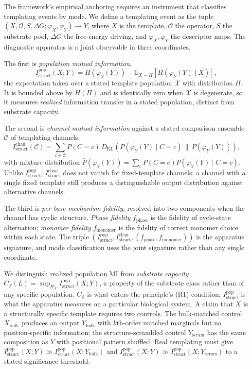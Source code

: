\documentclass[aps,prx,reprint,amsmath,amssymb,floatfix,superscriptaddress,nofootinbib]{revtex4-2}
\theoremstyle{plain-thm}
\theoremstyle{definition-thm}
\newcommand{\Istructpop}{I_{\mathrm{struct}}^{\mathrm{pop}}}
\newcommand{\Istructchan}{I_{\mathrm{struct}}^{\mathrm{chan}}}
\newcommand{\fphase}{f_{\mathrm{phase}}}
\newcommand{\fmonomer}{f_{\mathrm{monomer}}}
\newcommand{\Csub}{C_{\mathcal{S}}}
\newcommand{\descX}{\varphi_X}
\newcommand{\descY}{\varphi_Y}
\newcommand{\KL}[2]{D_{\mathrm{KL}}\!\left(#1 \,\|\, #2\right)}
\newcommand{\Op}{\mathcal{O}}
\begin{document}
The framework's empirical anchoring requires an instrument that classifies templating events by mode. We define a templating event as the tuple $(X, \Op, S, \Delta G; \descX, \descY) \to Y$, where $X$ is the template, $\Op$ the operator, $S$ the substrate pool, $\Delta G$ the free-energy driving, and $\descX, \descY$ the descriptor maps. The diagnostic apparatus is a joint observable in three coordinates.

The first is \textit{population mutual information},
\begin{equation}
\Istructpop(X; Y) = H(\descY(Y)) - \mathbb{E}_{X \sim \Pi}\left[H(\descY(Y) \mid X)\right],
\end{equation}
the expectation taken over a stated template population $\mathcal{X}$ with distribution $\Pi$. It is bounded above by $H(\Pi)$ and is identically zero when $\mathcal{X}$ is degenerate, so it measures \textit{realized} information transfer in a stated population, distinct from substrate capacity.

The second is \textit{channel mutual information} against a stated comparison ensemble $\mathcal{C}$ of templating channels,
\begin{equation}
\Istructchan(\mathcal{C}) = \sum_{c \in \mathcal{C}} P(C = c) \,\KL{P(\descY(Y) \mid C = c)}{\bar{P}(\descY(Y))},
\end{equation}
with mixture distribution $\bar{P}(\descY(Y)) = \sum_c P(C = c) P(\descY(Y) \mid C = c)$. Unlike $\Istructpop$, $\Istructchan$ does not vanish for fixed-template channels: a channel with a single fixed template still produces a distinguishable output distribution against alternative channels.

The third is \textit{per-base mechanism fidelity}, resolved into two components when the channel has cyclic structure. \textit{Phase fidelity} $\fphase$ is the fidelity of cycle-state alternation; \textit{monomer fidelity} $\fmonomer$ is the fidelity of correct monomer choice within each state. The triple $(\Istructpop, \Istructchan, (\fphase, \fmonomer))$ is the apparatus signature, and mode classification uses the joint signature rather than any single coordinate.

We distinguish realized population MI from \textit{substrate capacity} $\Csub(L) = \sup_{\Pi_X} \Istructpop(X; Y)$, a property of the substrate class rather than of any specific population. $\Csub$ is what enters the principle's (R1) condition; $\Istructpop$ is what the apparatus measures on a particular biological system. A claim that $X$ is a structurally specific template requires two controls. The bulk-matched control $X_{\mathrm{bulk}}$ produces an output $Y_{\mathrm{bulk}}$ with $k$th-order matched marginals but no position-specific information; the structure-scrambled control $Y_{\mathrm{scram}}$ has the same composition as $Y$ with positional pattern shuffled. Real templating must give $\Istructpop(X; Y) \gg \Istructpop(X; Y_{\mathrm{bulk}})$ and $\Istructpop(X; Y) \gg \Istructpop(X; Y_{\mathrm{scram}})$ to a stated significance threshold.
\end{document}

